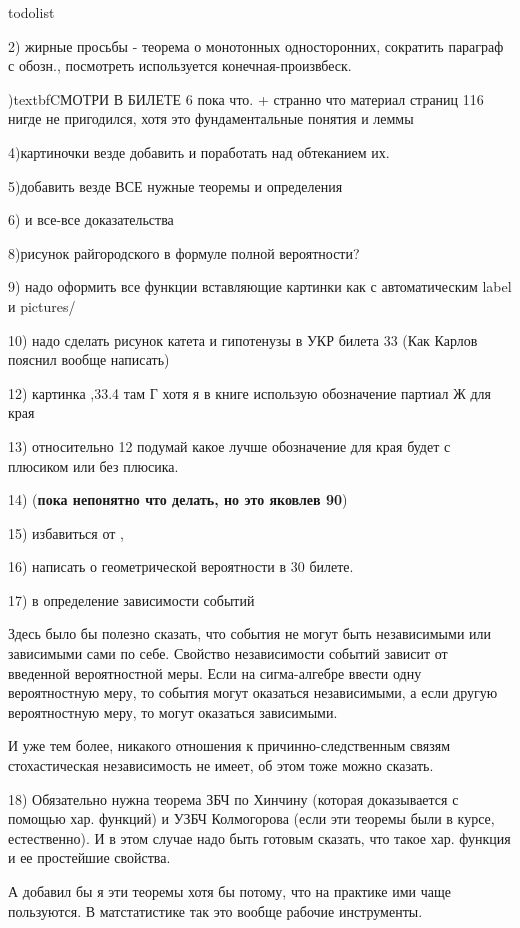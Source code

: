 todolist

 2) жирные просьбы - теорема о монотонных односторонних, сократить параграф с обозн., посмотреть используется конечная-произвбеск.

\3)textbf{CМОТРИ В БИЛЕТЕ 6 пока что. + странно что материал страниц 116 нигде не пригодился, хотя это фундаментальные понятия и леммы}
 
4)картиночки везде добавить и поработать над обтеканием их.

5)добавить везде ВСЕ нужные теоремы и определения
 
6) и все-все доказательства
 
8)рисунок райгородского в формуле полной вероятности?
 
9) надо оформить все функции вставляющие картинки как \usepict с автоматическим label и pictures/
 
10) надо сделать рисунок катета и гипотенузы в УКР билета 33
(Как Карлов пояснил вообще написать)
 

12) картинка ,33.4 там Г хотя я в книге использую обозначение партиал Ж для края

13) относительно 12 подумай какое лучше обозначение для края будет с плюсиком или без плюсика. 


14) (\textbf{пока непонятно что делать, но это яковлев 90})

15) избавиться от \fa, \ex 

16) написать о геометрической вероятности в 30 билете.

17) в определение зависимости событий

Здесь было бы полезно сказать, что события не могут быть независимыми или зависимыми сами по себе. Свойство независимости событий зависит от введенной вероятностной меры. Если на сигма-алгебре ввести одну вероятностную меру, то события могут оказаться независимыми, а если другую вероятностную меру, то могут оказаться зависимыми.

И уже тем более, никакого отношения к причинно-следственным связям стохастическая независимость не имеет, об этом тоже можно сказать.

18) Обязательно нужна теорема ЗБЧ по Хинчину (которая доказывается с помощью хар. функций) и УЗБЧ Колмогорова (если эти теоремы были в курсе, естественно). И в этом случае надо быть готовым сказать, что такое хар. функция и ее простейшие свойства.

А добавил бы я эти теоремы хотя бы потому, что на практике ими чаще  пользуются. В матстатистике так это вообще рабочие инструменты.

